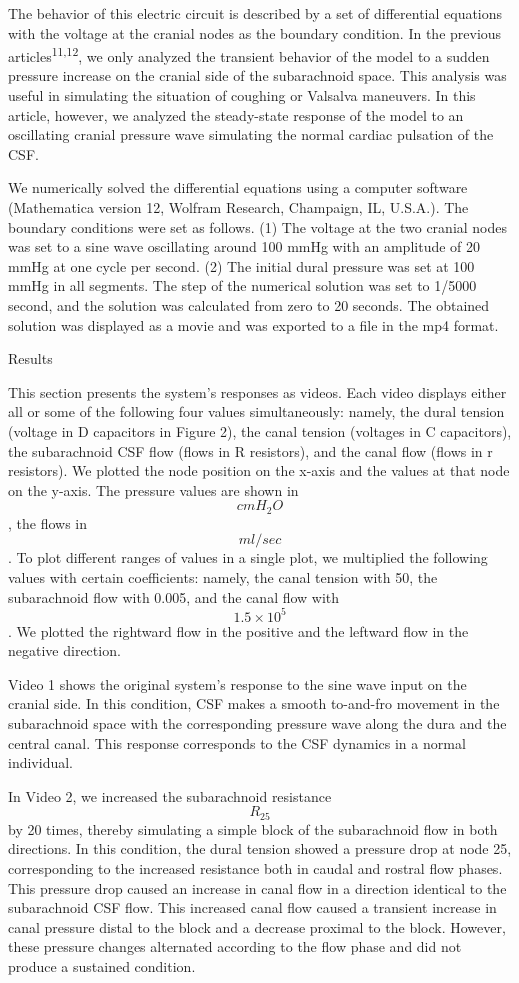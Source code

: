 \documentclass[a4paper,12pt]{article}
\begin{document}
The behavior of this electric circuit is described by a set of differential equations with the voltage at the cranial nodes as the boundary condition. In the previous articles\textsuperscript{11,12}, we only analyzed the transient behavior of the model to a sudden pressure increase on the cranial side of the subarachnoid space. This analysis was useful in simulating the situation of coughing or Valsalva maneuvers. In this article, however, we analyzed the steady-state response of the model to an oscillating cranial pressure wave simulating the normal cardiac pulsation of the CSF.

We numerically solved the differential equations using a computer software (Mathematica version 12, Wolfram Research, Champaign, IL, U.S.A.). The boundary conditions were set as follows. (1) The voltage at the two cranial nodes was set to a sine wave oscillating around 100 mmHg with an amplitude of 20 mmHg at one cycle per second. (2) The initial dural pressure was set at 100 mmHg in all segments. The step of the numerical solution was set to 1/5000 second, and the solution was calculated from zero to 20 seconds. The obtained solution was displayed as a movie and was exported to a file in the mp4 format.

Results

This section presents the system's responses as videos. Each video displays either all or some of the following four values simultaneously: namely, the dural tension (voltage in D capacitors in Figure 2), the canal tension (voltages in C capacitors), the subarachnoid CSF flow (flows in R resistors), and the canal flow (flows in r resistors). We plotted the node position on the x-axis and the values at that node on the y-axis. The pressure values are shown in \[cmH_2O\], the flows in \[ml/sec\]. To plot different ranges of values in a single plot, we multiplied the following values with certain coefficients: namely, the canal tension with 50, the subarachnoid flow with 0.005, and the canal flow with \[1.5\times10^{5}\]. We plotted the rightward flow in the positive and the leftward flow in the negative direction.

Video 1 shows the original system's response to the sine wave input on the cranial side. In this condition, CSF makes a smooth to-and-fro movement in the subarachnoid space with the corresponding pressure wave along the dura and the central canal. This response corresponds to the CSF dynamics in a normal individual.

In Video 2, we increased the subarachnoid resistance \[R_{25}\] by 20 times, thereby simulating a simple block of the subarachnoid flow in both directions. In this condition, the dural tension showed a pressure drop at node 25, corresponding to the increased resistance both in caudal and rostral flow phases. This pressure drop caused an increase in canal flow in a direction identical to the subarachnoid CSF flow. This increased canal flow caused a transient increase in canal pressure distal to the block and a decrease proximal to the block. However, these pressure changes alternated according to the flow phase and did not produce a sustained condition.
\end{document}
